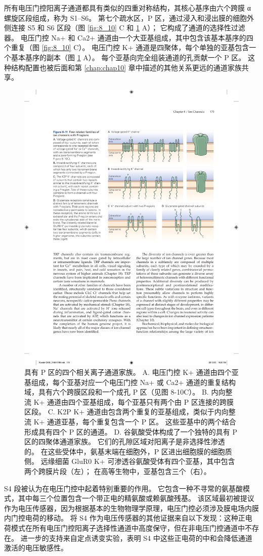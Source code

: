 所有电压门控阳离子通道都具有类似的四重对称结构，其核心基序由六个跨膜 α 螺旋区段组成，称为 S1–S6。 
第七个疏水区，P 区，通过浸入和浸出膜的细胞外侧连接 S5 和 S6 区段（图 \ref{fig:8_10} C 和 \ref{fig:8_11} A）； 它构成了通道的选择性过滤器。 
电压门控 Na+ 和 Ca2+ 通道由一个大亚基组成，其中包含该基本基序的四个重复（图 \ref{fig:8_10} C）。 
电压门控 K+ 通道是四聚体，每个单独的亚基包含一个基本基序的副本（图 \ref{fig:8_11} A）。 
每个亚基向完全组装通道的孔贡献一个 P 区。 
这种结构配置也被后面和第 \ref{chap:chap10} 章中描述的其他关系更远的通道家族共享。

\begin{figure}[htbp]
	\centering
	\includegraphics[width=0.7\linewidth]{chap08/fig_8_11}
	\caption{具有 P 区的四个相关离子通道家族。 A. 电压门控 K+ 通道由四个亚基组成，每个亚基对应一个电压门控 Na+ 或 Ca2+ 通道的重复结构域，具有六个跨膜区段和一个成孔 P 区（见图 8-10C）。 B. 内向整流 K+ 通道由四个亚基组成，每个亚基只有两个由 P 区连接的跨膜区段。 C. K2P K+ 通道由包含两个重复的亚基组成，类似于内向整流 K+ 通道亚基，每个重复包含一个 P 区。 这些亚基中的两个结合形成具有四个 P 区的通道。 D. 谷氨酸受体构成了一个独特的具有 P 区的四聚体通道家族。 它们的孔隙区域对阳离子是非选择性渗透的。 在这些受体中，氨基末端在细胞外，P 区进出细胞膜的细胞质侧。 远缘细菌 GluR0 K+ 可渗透谷氨酸受体有四个亚基，其中包含两个跨膜片段（左）； 在高等生物中，亚基包含三个（右）。}
	\label{fig:8_11}
\end{figure}


S4 段被认为在电压门控中起着特别重要的作用。 
它包含一种不寻常的氨基酸模式，其中每三个位置包含一个带正电的精氨酸或赖氨酸残基。 
该区域最初被提议作为电压传感器，因为根据基本的生物物理学原理，电压门控必须涉及膜电场内膜内门控电荷的移动。 
将 S4 作为电压传感器的其他证据来自以下发现：这种正电荷模式在所有电压门控阳离子选择性通道中高度保守，但在非电压门控通道中不存在。 
进一步的支持来自定点诱变实验，表明 S4 中这些正电荷的中和会降低通道激活的电压敏感性。


